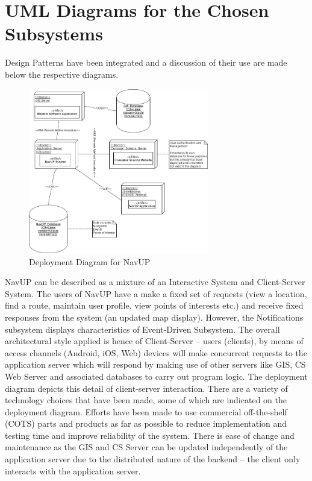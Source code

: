 \documentclass[runningheads,a4paper]{article}
\begin{document}
\section{UML Diagrams for the Chosen Subsystems}

Design Patterns have been integrated and a discussion of their use are made below the respective diagrams.


\begin{figure}[H]
   	\centering
   	\includegraphics[width=0.7\textwidth]{DeploymentDiagram.jpg}
   	\caption{Deployment Diagram for NavUP}
\end{figure}

NavUP can be described as a mixture of an Interactive System and Client-Server System. The users of NavUP have a make a fixed set of requests (view a location, find a route, maintain user profile, view points of interests etc.) and receive fixed responses from the system (an updated map display). However, the Notifications subsystem displays characteristics of Event-Driven Subsystem. 
The overall architectural style applied is hence of Client-Server – users (clients), by means of access channels (Android, iOS, Web) devices will make concurrent requests to the application server which will respond by making use of other servers like GIS, CS Web Server and associated databases to carry out program logic. The deployment diagram depicts this detail of client-server interaction.
There are a variety of technology choices that have been made, some of which are indicated on the deployment diagram. Efforts have been made to use commercial off-the-shelf (COTS) parts and products as far as possible to reduce implementation and testing time and improve reliability of the system. There is ease of change and maintenance as the GIS and CS Server can be updated independently of the application server due to the distributed nature of the backend – the client only interacts with the application server.
\end{document}
